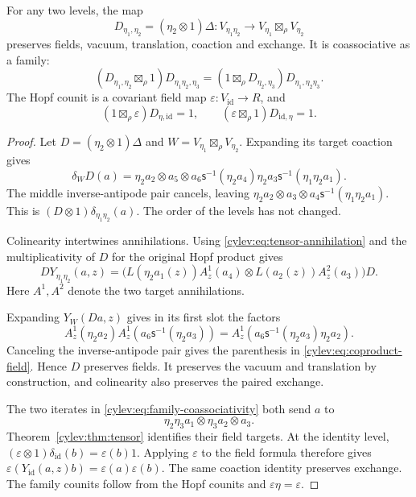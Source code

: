 \begin{theorem}\label{cylev:thm:coproduct}
For any two levels, the map
\begin{equation}\label{cylev:eq:coproduct}
 D_{\eta_1,\eta_2}=(\eta_2\otimes1)\Delta:
 V_{\eta_1\eta_2}\longrightarrow V_{\eta_1}\boxtimes_\rho V_{\eta_2}
\end{equation}
preserves fields, vacuum, translation, coaction and exchange.
It is coassociative as a family:
\begin{equation}\label{cylev:eq:family-coassociativity}
 (D_{\eta_1,\eta_2}\boxtimes_\rho1)D_{\eta_1\eta_2,\eta_3}
 =(1\boxtimes_\rho D_{\eta_2,\eta_3})D_{\eta_1,\eta_2\eta_3}.
\end{equation}
The Hopf counit is a covariant field map
$\varepsilon:V_{\mathrm{id}}\to R$, and
\[
 (1\boxtimes_\rho\varepsilon)D_{\eta,\mathrm{id}}=1,
 \qquad
 (\varepsilon\boxtimes_\rho1)D_{\mathrm{id},\eta}=1.
\]
\end{theorem}
\begin{proof}
Let $D=(\eta_2\otimes1)\Delta$ and
$W=V_{\eta_1}\boxtimes_\rho V_{\eta_2}$.
Expanding its target coaction gives
\[
 \delta_WD(a)=\eta_2a_2\otimes a_5\otimes
 a_6\mathsf s^{-1}(\eta_2a_4)\eta_2a_3
                       \mathsf s^{-1}(\eta_1\eta_2a_1).
\]
The middle inverse-antipode pair cancels, leaving
$\eta_2a_2\otimes a_3\otimes
a_4\mathsf s^{-1}(\eta_1\eta_2a_1)$.
This is $(D\otimes1)\delta_{\eta_1\eta_2}(a)$.
The order of the levels has not changed.

Colinearity intertwines annihilations.
Using \eqref{cylev:eq:tensor-annihilation} and the multiplicativity
of $D$ for the original Hopf product gives
\begin{equation}\label{cylev:eq:coproduct-field}
 D Y_{\eta_1\eta_2}(a,z)
 =\bigl(L(\eta_2a_1(z))A_z^1(a_4)
           \otimes L(a_2(z))A_z^2(a_3)\bigr)D.
\end{equation}
Here $A^1,A^2$ denote the two target annihilations.

Expanding $Y_W(Da,z)$ gives in its first slot the factors
\[
 A_z^1(\eta_2a_2)A_z^1(a_6\mathsf s^{-1}(\eta_2a_3))
       =A_z^1(a_6\mathsf s^{-1}(\eta_2a_3)\eta_2a_2).
\]
Canceling the inverse-antipode pair gives the parenthesis in
\eqref{cylev:eq:coproduct-field}. Hence $D$ preserves fields.
It preserves the vacuum and translation by construction, and
colinearity also preserves the paired exchange.

The two iterates in \eqref{cylev:eq:family-coassociativity} both send
$a$ to
\begin{equation}\label{cylev:eq:triple-coproduct}
 \eta_2\eta_3a_1\otimes\eta_3a_2\otimes a_3.
\end{equation}
Theorem~\ref{cylev:thm:tensor} identifies their field targets.
At the identity level,
$(\varepsilon\otimes1)\delta_{\mathrm{id}}(b)=\varepsilon(b)1$.
Applying $\varepsilon$ to the field formula therefore gives
$\varepsilon(Y_{\mathrm{id}}(a,z)b)=\varepsilon(a)\varepsilon(b)$.
The same coaction identity preserves exchange.
The family counits follow from the Hopf counits and
$\varepsilon\eta=\varepsilon$.
\end{proof}

